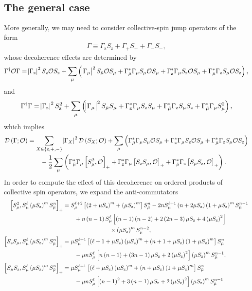 \documentclass[aps,11pt,notitlepage,nofootinbib,longbibliography]{revtex4-1}
\newcommand{\f}[2]{\dfrac{#1}{#2}} %
\newcommand{\p}[1]{\left(#1\right)} %
\renewcommand{\sp}[1]{\left[#1\right]} %
\renewcommand{\set}[1]{\left\{#1\right\}} %
\newcommand{\D}{\mathcal{D}}
\renewcommand{\O}{\mathcal{O}}
\newcommand{\z}{\text{z}}
\newcommand{\bmu}{{\bar\mu}}
\newcommand{\1}{\mathds{1}}
\begin{document}
\subsection{The general case}
\label{sec:general_collective}

More generally, we may need to consider collective-spin jump operators
of the form
\begin{align}
  \Gamma \equiv \Gamma_\z S_\z + \Gamma_+ S_+ + \Gamma_- S_-,
\end{align}
whose decoherence effects are determined by
\begin{align}
  \Gamma^\dag \O \Gamma
  = \abs{\Gamma_\z}^2 S_\z \O S_\z
  + \sum_\mu \p{\abs{\Gamma_\mu}^2 S_\bmu \O S_\mu
    + \Gamma_\bmu^* \Gamma_\mu S_\mu \O S_\mu
    + \Gamma_\z^* \Gamma_\mu S_\z \O S_\mu
    + \Gamma_\bmu^* \Gamma_\z S_\mu \O S_\z},
\end{align}
and
\begin{align}
  \Gamma^\dag \Gamma
  = \abs{\Gamma_\z}^2 S_\z^2
  + \sum_\mu \p{\abs{\Gamma_\mu}^2 S_\bmu S_\mu
    + \Gamma_\z^*\Gamma_\mu S_\z S_\mu
    + \Gamma_\bmu^* \Gamma_\z S_\mu S_\z
    + \Gamma_\bmu^* \Gamma_\mu S_\mu^2},
\end{align}
which implies
\begin{align}
  \D\p{\Gamma;\O}
  &= \sum_{X\in\set{\z,+,-}} \abs{\Gamma_X}^2 \D\p{S_X;\O}
  + \sum_\mu \p{\Gamma_\bmu^* \Gamma_\mu S_\mu \O S_\mu
    + \Gamma_\z^* \Gamma_\mu S_\z \O S_\mu
    + \Gamma_\bmu^* \Gamma_\z S_\mu \O S_\z}
  \notag \\
  &\qquad -\f12 \sum_\mu\p{\Gamma_\bmu^* \Gamma_\mu \sp{S_\mu^2, \O}_+
    + \Gamma_\z^*\Gamma_\mu \sp{S_\z S_\mu, \O}_+
    + \Gamma_\bmu^* \Gamma_\z \sp{S_\mu S_\z, \O}_+}.
\end{align}
In order to compute the effect of this decoherence on ordered products
of collective spin operators, we expand the anti-commutators
\begin{align}
  \sp{S_\mu^2, S_\mu^\ell \p{\mu S_\z}^m S_\bmu^n}_+
  &= S_\mu^{\ell+2} \sp{\p{2+\mu S_\z}^m+\p{\mu S_\z}^m} S_\bmu^n
  - 2n S_\mu^{\ell+1} \p{n+2\mu S_\z} \p{1+\mu S_\z}^m S_\bmu^{n-1}
  \notag \\
  &\qquad + n\p{n-1} S_\mu^\ell \sp{\p{n-1}\p{n-2}
    + 2\p{2n-3}\mu S_\z + 4\p{\mu S_\z}^2} \notag \\
  &\qquad\qquad\qquad\qquad \times \p{\mu S_\z}^m S_\bmu^{n-2},
  \allowdisplaybreaks \\
  \sp{S_\z S_\mu, S_\mu^\ell \p{\mu S_\z}^m S_\bmu^n}_+
  &= \mu S_\mu^{\ell+1} \sp{\p{\ell+1+\mu S_\z}\p{\mu S_\z}^m
    + \p{n+1+\mu S_\z} \p{1+\mu S_\z}^m } S_\bmu^n \notag \\
  &\qquad - \mu n S_\mu^\ell \sp{n \p{n-1}
    + \p{3n-1}\mu S_\z + 2\p{\mu S_\z}^2} \p{\mu S_\z}^m S_\bmu^{n-1},
  \allowdisplaybreaks \\
  \sp{S_\mu S_\z, S_\mu^\ell \p{\mu S_\z}^m S_\bmu^n}_+
  &= \mu S_\mu^{\ell+1} \sp{\p{\ell+\mu S_\z}\p{\mu S_\z}^m
    + \p{n+\mu S_\z} \p{1+\mu S_\z}^m} S_\bmu^n \notag \\
  &\qquad - \mu n S_\mu^\ell \sp{\p{n-1}^2
    + 3\p{n-1}\mu S_\z + 2\p{\mu S_\z}^2} \p{\mu S_\z}^m S_\bmu^{n-1}.
\end{align}
\end{document}
